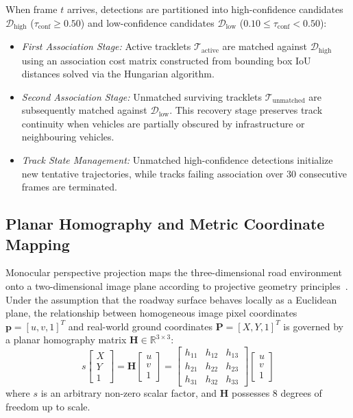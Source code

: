 \documentclass[conference]{IEEEtran}
\begin{document}
When frame $t$ arrives, detections are partitioned into high-confidence candidates $\mathcal{D}_{\text{high}}$ ($\tau_{\text{conf}} \ge 0.50$) and low-confidence candidates $\mathcal{D}_{\text{low}}$ ($0.10 \le \tau_{\text{conf}} < 0.50$):
\begin{itemize}
    \item[\textit{i)}] \textit{First Association Stage:} Active tracklets $\mathcal{T}_{\text{active}}$ are matched against $\mathcal{D}_{\text{high}}$ using an association cost matrix constructed from bounding box IoU distances solved via the Hungarian algorithm.
    \item[\textit{ii)}] \textit{Second Association Stage:} Unmatched surviving tracklets $\mathcal{T}_{\text{unmatched}}$ are subsequently matched against $\mathcal{D}_{\text{low}}$. This recovery stage preserves track continuity when vehicles are partially obscured by infrastructure or neighbouring vehicles.
    \item[\textit{iii)}] \textit{Track State Management:} Unmatched high-confidence detections initialize new tentative trajectories, while tracks failing association over 30 consecutive frames are terminated.
\end{itemize}

\subsection{Planar Homography and Metric Coordinate Mapping}
Monocular perspective projection maps the three-dimensional road environment onto a two-dimensional image plane according to projective geometry principles~\cite{hartley2003multiple}. Under the assumption that the roadway surface behaves locally as a Euclidean plane, the relationship between homogeneous image pixel coordinates $\mathbf{p} = [u, v, 1]^T$ and real-world ground coordinates $\mathbf{P} = [X, Y, 1]^T$ is governed by a planar homography matrix $\mathbf{H} \in \mathbb{R}^{3 \times 3}$:
\begin{equation}
s \begin{bmatrix} X \\ Y \\ 1 \end{bmatrix} = \mathbf{H} \begin{bmatrix} u \\ v \\ 1 \end{bmatrix} = \begin{bmatrix} h_{11} & h_{12} & h_{13} \\ h_{21} & h_{22} & h_{23} \\ h_{31} & h_{32} & h_{33} \end{bmatrix} \begin{bmatrix} u \\ v \\ 1 \end{bmatrix}
\label{eq:homography}
\end{equation}
where $s$ is an arbitrary non-zero scalar factor, and $\mathbf{H}$ possesses 8 degrees of freedom up to scale.
\end{document}
